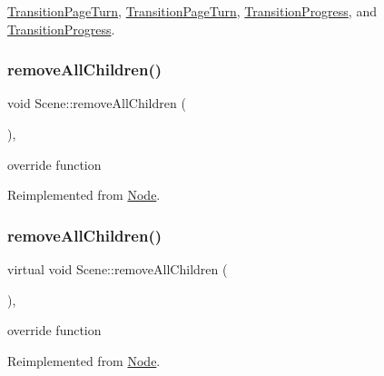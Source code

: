 \hyperlink{classTransitionPageTurn_adb15cf19b760250156d6fa3f2e1dbf31}{Transition\+Page\+Turn}, \hyperlink{classTransitionPageTurn_a451cf478d1f344678dde975e0db39b46}{Transition\+Page\+Turn}, \hyperlink{classTransitionProgress_aa3ccb7515691f10b5410b75d912e2b68}{Transition\+Progress}, and \hyperlink{classTransitionProgress_a4bb6172fb74abe0a0a0de2a3742a9cf6}{Transition\+Progress}.

\mbox{\label{classScene_a7e54f25b14b057ab896b0ef3262cef86}} 
\subsubsection{\texorpdfstring{remove\+All\+Children()}{removeAllChildren()}\hspace{0.1cm}{\footnotesize\ttfamily [1/2]}}
{\footnotesize\ttfamily void Scene\+::remove\+All\+Children (\begin{DoxyParamCaption}{ }\end{DoxyParamCaption})\hspace{0.3cm}{\ttfamily [override]}, {\ttfamily [virtual]}}

override function 

Reimplemented from \hyperlink{classNode_a0f6ef5518d2e5dd5be405e98b37ace4a}{Node}.

\mbox{\label{classScene_af55bdd0731d6ccfdd1c95c4011451adb}} 
\subsubsection{\texorpdfstring{remove\+All\+Children()}{removeAllChildren()}\hspace{0.1cm}{\footnotesize\ttfamily [2/2]}}
{\footnotesize\ttfamily virtual void Scene\+::remove\+All\+Children (\begin{DoxyParamCaption}{ }\end{DoxyParamCaption})\hspace{0.3cm}{\ttfamily [override]}, {\ttfamily [virtual]}}

override function 

Reimplemented from \hyperlink{classNode_a0f6ef5518d2e5dd5be405e98b37ace4a}{Node}.

